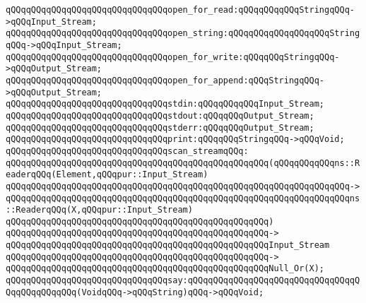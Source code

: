 \newline
\verb|qQQqqQQqqQQqqQQqqQQqqQQqqQQqqQQqopen_for_read:qQQqqQQqqQQqStringqQQq->qQQqInput_Stream;|\newline
\verb|qQQqqQQqqQQqqQQqqQQqqQQqqQQqqQQqopen_string:qQQqqQQqqQQqqQQqqQQqStringqQQq->qQQqInput_Stream;|\newline
\verb|qQQqqQQqqQQqqQQqqQQqqQQqqQQqqQQqopen_for_write:qQQqqQQqStringqQQq->qQQqOutput_Stream;|\newline
\verb|qQQqqQQqqQQqqQQqqQQqqQQqqQQqqQQqopen_for_append:qQQqStringqQQq->qQQqOutput_Stream;|\newline
\newline
\verb|qQQqqQQqqQQqqQQqqQQqqQQqqQQqqQQqstdin:qQQqqQQqqQQqInput_Stream;|\newline
\verb|qQQqqQQqqQQqqQQqqQQqqQQqqQQqqQQqstdout:qQQqqQQqOutput_Stream;|\newline
\verb|qQQqqQQqqQQqqQQqqQQqqQQqqQQqqQQqstderr:qQQqqQQqOutput_Stream;|\newline
\newline
\verb|qQQqqQQqqQQqqQQqqQQqqQQqqQQqqQQqprint:qQQqqQQqStringqQQq->qQQqVoid;|\newline
\newline
\verb|qQQqqQQqqQQqqQQqqQQqqQQqqQQqqQQqscan_streamqQQq:|\newline
\verb|qQQqqQQqqQQqqQQqqQQqqQQqqQQqqQQqqQQqqQQqqQQqqQQqqQQq(qQQqqQQqqQQqns::ReaderqQQq(Element,qQQqpur::Input_Stream)|\newline
\verb|qQQqqQQqqQQqqQQqqQQqqQQqqQQqqQQqqQQqqQQqqQQqqQQqqQQqqQQqqQQqqQQqqQQq->|\newline
\verb|qQQqqQQqqQQqqQQqqQQqqQQqqQQqqQQqqQQqqQQqqQQqqQQqqQQqqQQqqQQqqQQqqQQqns::ReaderqQQq(X,qQQqpur::Input_Stream)|\newline
\verb|qQQqqQQqqQQqqQQqqQQqqQQqqQQqqQQqqQQqqQQqqQQqqQQqqQQq)|\newline
\verb|qQQqqQQqqQQqqQQqqQQqqQQqqQQqqQQqqQQqqQQqqQQqqQQqqQQq->|\newline
\verb|qQQqqQQqqQQqqQQqqQQqqQQqqQQqqQQqqQQqqQQqqQQqqQQqqQQqInput_Stream|\newline
\verb|qQQqqQQqqQQqqQQqqQQqqQQqqQQqqQQqqQQqqQQqqQQqqQQqqQQq->|\newline
\verb|qQQqqQQqqQQqqQQqqQQqqQQqqQQqqQQqqQQqqQQqqQQqqQQqqQQqNull_Or(X);|\newline
\newline
\newline
\verb|qQQqqQQqqQQqqQQqqQQqqQQqqQQqqQQqsay:qQQqqQQqqQQqqQQqqQQqqQQqqQQqqQQqqQQqqQQqqQQqqQQq(VoidqQQq->qQQqString)qQQq->qQQqVoid;|\newline

